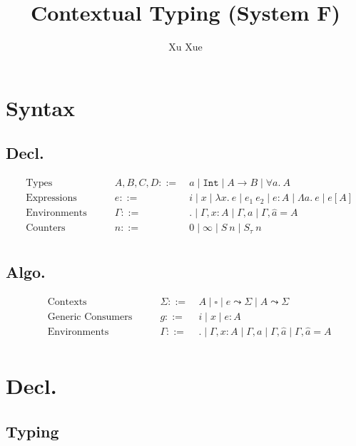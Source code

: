 \documentclass{article}
\title{Contextual Typing (System F)}
\author{Xu Xue}
\begin{document}
\maketitle

\section{Syntax}

\subsection{Decl.}

\begin{align*}
&\text{Types} \quad\quad &A, B, C, D ::=&~ a \mid \mathtt{Int} \mid A \rightarrow B \mid \forall a.~A\\
&\text{Expressions} \quad \quad &e::=&~ i \mid x \mid \lambda x . ~e \mid e_1~e_2 \mid e : A \mid \Lambda a.~e \mid e[A]\\
&\text{Environments} \quad\quad &\Gamma::=&~ . \mid \Gamma, x : A \mid \Gamma, a \mid \Gamma, \hat{a} = A\\
&\text{Counters} \quad\quad &n ::=&~ 0 \mid \infty \mid S~n \mid S_{\tau}~n\\
\end{align*}

\subsection{Algo.}

\begin{align*}
    &\text{Contexts} \quad\quad &\Sigma ::=&~ A \mid \square \mid \boxed{e} \leadsto \Sigma \mid \boxed{A} \leadsto \Sigma\\
    &\text{Generic Consumers} \quad \quad &g::=&~ i \mid x \mid e : A\\
    &\text{Environments} \quad\quad &\Gamma ::=&~ . \mid \Gamma, x : A \mid \Gamma, a \mid \Gamma, \hat{a} \mid \Gamma, \hat{a}= A\\
\end{align*}


\section{Decl.}

\subsection{Typing}
\end{document}

